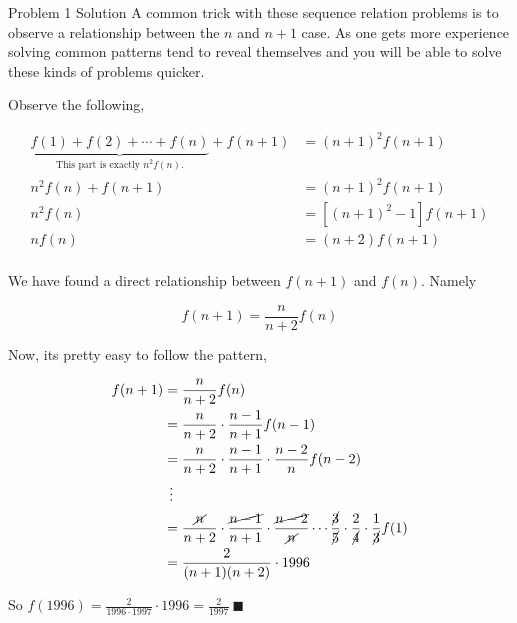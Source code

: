 \documentclass{article}
\begin{document}
\begin{solution}{Problem 1 Solution}
A common trick with these sequence relation problems is to
observe a relationship between the $n$ and $n+1$ case. As one gets more
experience solving common patterns tend to reveal themselves and you will
be able to solve these kinds of problems quicker. \vspace{0.2cm}

Observe the following,

\[
\begin{aligned}
\underbrace{f(1) + f(2) + \cdots + f(n)}_{\text{This part is exactly } n^2 f(n)\text{.}} + f(n+1) &= (n+1)^2 f(n+1) \\
n^2 f(n) + f(n+1) &= (n+1)^2 f(n+1) \\
n^2 f(n) &= [(n+1)^2 - 1] f(n+1) \\
n f(n) &= (n+2) f(n+1) \\
\end{aligned}
\]

We have found a direct relationship between $f(n+1)$ and $f(n)$. Namely

$$
f(n+1) = \frac{n}{n+2} f(n)
$$

Now, its pretty easy to follow the pattern,

\[
\begin{aligned}
f(n+1) &= \frac{n}{n+2} f(n) \\
       &= \frac{n}{n+2} \cdot \frac{n-1}{n+1} f(n-1) \\
       &= \frac{n}{n+2} \cdot \frac{n-1}{n+1} \cdot \frac{n-2}{n} f(n-2) \\
       &\;\, \vdots \\
       &= \frac{\cancel{n}}{n+2} \cdot \frac{\cancel{n-1}}{n+1} \cdot \frac{\cancel{n-2}}{\cancel{n}} \cdots \frac{\cancel{3}}{\cancel{5}} \cdot \frac{2}{\cancel{4}} \cdot \frac{1}{\cancel{3}} f(1) \\
       &= \frac{2}{(n+1)(n+2)} \cdot 1996 \\
\end{aligned}
\]

So $f(1996) = \frac{2}{1996 \cdot 1997} \cdot 1996 = \boxed{\frac{2}{1997}} \ \blacksquare$
\end{solution}

\vspace{0.7cm}
\end{document}
